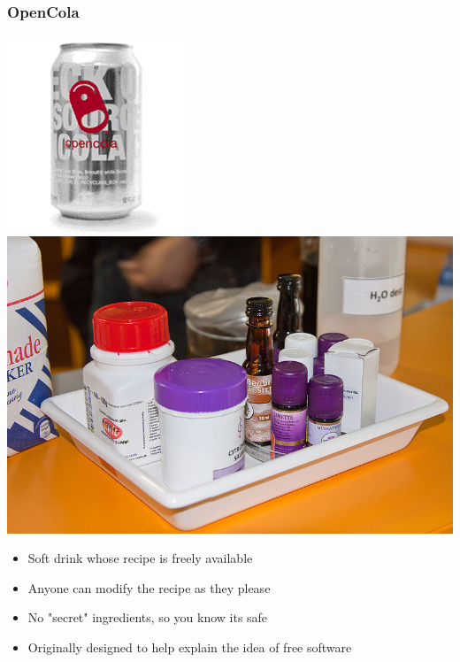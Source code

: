 \documentclass{beamer}
\begin{document}
\begin{frame}
  \frametitle{OpenCola}
  \begin{center} 
    \includegraphics[height=0.3\textheight]{../img/opencola} \hspace{2em} \includegraphics[height=0.3\textheight]{../img/opencola-ingredients} 
  \end{center}
  \begin{itemize}
  \item Soft drink whose recipe is freely available
  \item Anyone can modify the recipe as they please
  \item No "secret" ingredients, so you know its safe
  \item Originally designed to help explain the idea of free software
  \end{itemize}
\end{frame}

\end{document}
